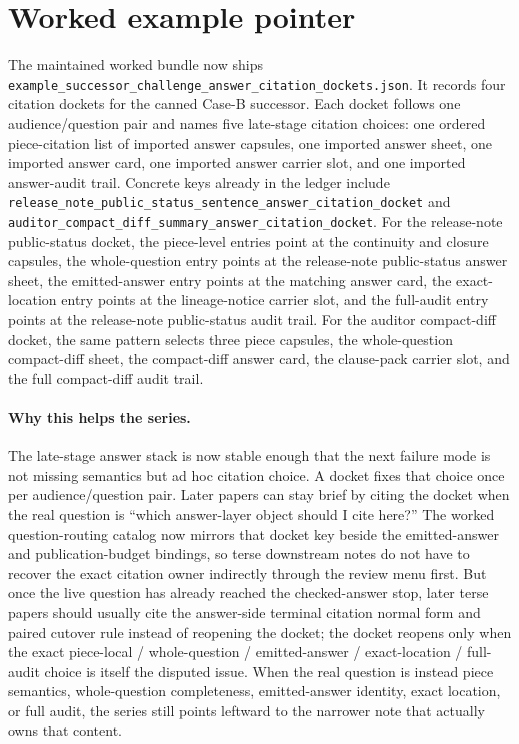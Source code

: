 \documentclass[11pt]{article}
\begin{document}
\section{Worked example pointer}
The maintained worked bundle now ships \texttt{example\_successor\_challenge\_answer\_citation\_dockets.json}.\cite{series:workedexample}
It records four citation dockets for the canned Case-B successor.
Each docket follows one audience/question pair and names five late-stage citation choices: one ordered piece-citation list of imported answer capsules, one imported answer sheet, one imported answer card, one imported answer carrier slot, and one imported answer-audit trail.
Concrete keys already in the ledger include \texttt{release\_note\_public\_status\_sentence\_answer\_citation\_docket} and \texttt{auditor\_compact\_diff\_summary\_answer\_citation\_docket}.
For the release-note public-status docket, the piece-level entries point at the continuity and closure capsules, the whole-question entry points at the release-note public-status answer sheet, the emitted-answer entry points at the matching answer card, the exact-location entry points at the lineage-notice carrier slot, and the full-audit entry points at the release-note public-status audit trail.
For the auditor compact-diff docket, the same pattern selects three piece capsules, the whole-question compact-diff sheet, the compact-diff answer card, the clause-pack carrier slot, and the full compact-diff audit trail.

\paragraph{Why this helps the series.}
The late-stage answer stack is now stable enough that the next failure mode is not missing semantics but ad hoc citation choice.
A docket fixes that choice once per audience/question pair.
Later papers can stay brief by citing the docket when the real question is ``which answer-layer object should I cite here?'' The worked question-routing catalog now mirrors that docket key beside the emitted-answer and publication-budget bindings, so terse downstream notes do not have to recover the exact citation owner indirectly through the review menu first.
But once the live question has already reached the checked-answer stop, later terse papers should usually cite the answer-side terminal citation normal form and paired cutover rule instead of reopening the docket; the docket reopens only when the exact piece-local / whole-question / emitted-answer / exact-location / full-audit choice is itself the disputed issue.\cite{series:challengeanswerreviewmenus,series:pairedterminalcitationdiscipline,series:pairedterminalcutoverrules}
When the real question is instead piece semantics, whole-question completeness, emitted-answer identity, exact location, or full audit, the series still points leftward to the narrower note that actually owns that content.
\end{document}
